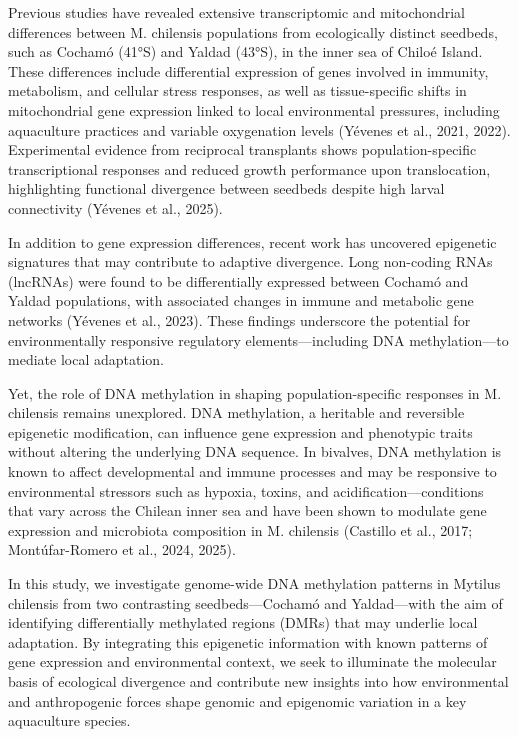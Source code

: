 \documentclass[
]{agujournal2019}
\begin{document}
Previous studies have revealed extensive transcriptomic and
mitochondrial differences between M. chilensis populations from
ecologically distinct seedbeds, such as Cochamó (41°S) and Yaldad
(43°S), in the inner sea of Chiloé Island. These differences include
differential expression of genes involved in immunity, metabolism, and
cellular stress responses, as well as tissue-specific shifts in
mitochondrial gene expression linked to local environmental pressures,
including aquaculture practices and variable oxygenation levels (Yévenes
et al., 2021, 2022). Experimental evidence from reciprocal transplants
shows population-specific transcriptional responses and reduced growth
performance upon translocation, highlighting functional divergence
between seedbeds despite high larval connectivity (Yévenes et al.,
2025).

In addition to gene expression differences, recent work has uncovered
epigenetic signatures that may contribute to adaptive divergence. Long
non-coding RNAs (lncRNAs) were found to be differentially expressed
between Cochamó and Yaldad populations, with associated changes in
immune and metabolic gene networks (Yévenes et al., 2023). These
findings underscore the potential for environmentally responsive
regulatory elements---including DNA methylation---to mediate local
adaptation.

Yet, the role of DNA methylation in shaping population-specific
responses in M. chilensis remains unexplored. DNA methylation, a
heritable and reversible epigenetic modification, can influence gene
expression and phenotypic traits without altering the underlying DNA
sequence. In bivalves, DNA methylation is known to affect developmental
and immune processes and may be responsive to environmental stressors
such as hypoxia, toxins, and acidification---conditions that vary across
the Chilean inner sea and have been shown to modulate gene expression
and microbiota composition in M. chilensis (Castillo et al., 2017;
Montúfar-Romero et al., 2024, 2025).

In this study, we investigate genome-wide DNA methylation patterns in
Mytilus chilensis from two contrasting seedbeds---Cochamó and
Yaldad---with the aim of identifying differentially methylated regions
(DMRs) that may underlie local adaptation. By integrating this
epigenetic information with known patterns of gene expression and
environmental context, we seek to illuminate the molecular basis of
ecological divergence and contribute new insights into how environmental
and anthropogenic forces shape genomic and epigenomic variation in a key
aquaculture species.
\end{document}
